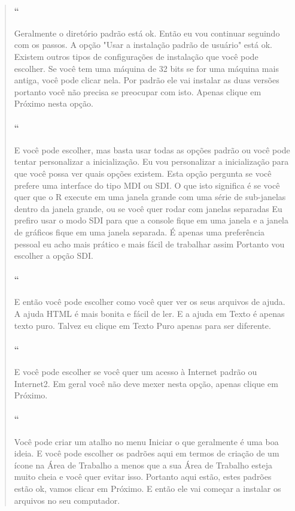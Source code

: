 \begin{quotation}
\begin{small}
\paragraph{``}
Geralmente o diretório padrão está ok. Então eu vou continuar seguindo com os passos. A opção "Usar a instalação padrão de usuário" está ok. Existem outros tipos de configurações de instalação que você pode escolher. Se você tem uma máquina de 32 bits se for uma máquina mais antiga, você pode clicar nela. Por padrão ele vai instalar as duas versões portanto você não precisa se preocupar com isto. Apenas clique em Próximo nesta opção. 

\paragraph{``}
E você pode escolher, mas basta usar todas as opções padrão ou você pode tentar personalizar a inicialização. Eu vou personalizar a inicialização para que você possa ver quais opções existem. Esta opção pergunta se você prefere uma interface do tipo MDI ou SDI. O que isto significa é se você quer que o R execute em uma janela grande com uma série de sub-janelas dentro da janela grande, ou se você quer rodar com janelas separadas Eu prefiro usar o modo SDI para que a console fique em uma janela e a janela de gráficos fique em uma janela separada. É apenas uma preferência pessoal eu acho mais prático e mais fácil de trabalhar assim Portanto vou escolher a opção SDI. 

\paragraph{``}
E então você pode escolher como você quer ver os seus arquivos de ajuda. A ajuda HTML é mais bonita e fácil de ler. E a ajuda em Texto é apenas texto puro. Talvez eu clique em Texto Puro apenas para ser diferente. 

\paragraph{``}
E você pode escolher se você quer um acesso à Internet padrão ou Internet2. Em geral você não deve mexer nesta opção, apenas clique em Próximo. 

\paragraph{``}
Você pode criar um atalho no menu Iniciar o que geralmente é uma boa ideia. E você pode escolher os padrões aqui em termos de criação de um ícone na Área de Trabalho a menos que a sua Área de Trabalho esteja muito cheia e você quer evitar isso. Portanto aqui estão, estes padrões estão ok, vamos clicar em Próximo. E então ele vai começar a instalar os arquivos no seu computador. 


\end{small}
\end{quotation}
